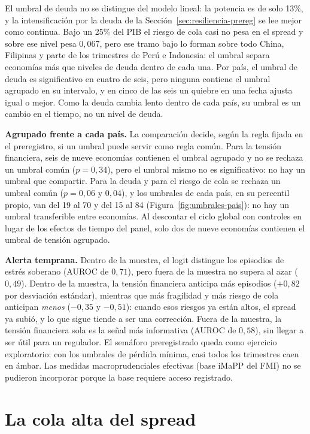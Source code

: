 El umbral de deuda no se distingue del modelo lineal: la potencia es de solo 13\%, y la intensificación por la deuda de la Sección~\ref{sec:resiliencia-prereg} se lee mejor como continua. Bajo un 25\% del PIB el riesgo de cola casi no pesa en el spread y sobre ese nivel pesa $0{,}067$, pero ese tramo bajo lo forman sobre todo China, Filipinas y parte de los trimestres de Perú e Indonesia: el umbral separa economías más que niveles de deuda dentro de cada una. Por país, el umbral de deuda es significativo en cuatro de seis, pero ninguna contiene el umbral agrupado en su intervalo, y en cinco de las seis un quiebre en una fecha ajusta igual o mejor. Como la deuda cambia lento dentro de cada país, su umbral es un cambio en el tiempo, no un nivel de deuda.

\textbf{Agrupado frente a cada país.} La comparación decide, según la regla fijada en el preregistro, si un umbral puede servir como regla común. Para la tensión financiera, seis de nueve economías contienen el umbral agrupado y no se rechaza un umbral común ($p=0{,}34$), pero el umbral mismo no es significativo: no hay un umbral que compartir. Para la deuda y para el riesgo de cola se rechaza un umbral común ($p=0{,}06$ y $0{,}04$), y los umbrales de cada país, en su percentil propio, van del 19 al 70 y del 15 al 84 (Figura~\ref{fig:umbrales-pais}): no hay un umbral transferible entre economías. Al descontar el ciclo global con controles en lugar de los efectos de tiempo del panel, solo dos de nueve economías contienen el umbral de tensión agrupado.

\textbf{Alerta temprana.} Dentro de la muestra, el logit distingue los episodios de estrés soberano (AUROC de $0{,}71$), pero fuera de la muestra no supera al azar ($0{,}49$). Dentro de la muestra, la tensión financiera anticipa más episodios ($+0{,}82$ por desviación estándar), mientras que más fragilidad y más riesgo de cola anticipan \emph{menos} ($-0{,}35$ y $-0{,}51$): cuando esos riesgos ya están altos, el spread ya subió, y lo que sigue tiende a ser una corrección. Fuera de la muestra, la tensión financiera sola es la señal más informativa (AUROC de $0{,}58$), sin llegar a ser útil para un regulador. El semáforo preregistrado queda como ejercicio exploratorio: con los umbrales de pérdida mínima, casi todos los trimestres caen en ámbar. Las medidas macroprudenciales efectivas (base iMaPP del FMI) no se pudieron incorporar porque la base requiere acceso registrado.


\section{La cola alta del spread}
\label{sec:cuantilica}

